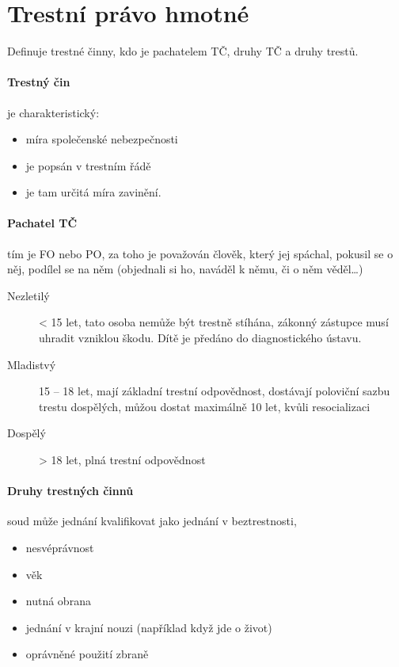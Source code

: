 \documentclass[10pt,a4paper,
twoside,%
]{report}
\begin{document}
\section{Trestní právo hmotné}
Definuje trestné činny, kdo je pachatelem TČ, druhy TČ a druhy trestů.

\paragraph{Trestný čin} je charakteristický:
\begin{itemize}
\item míra společenské nebezpečnosti
\item je popsán v trestním řádě
\item je tam určitá míra zavinění.
\end{itemize}

\paragraph{Pachatel TČ} tím je FO nebo PO, za toho je považován člověk, který jej spáchal, pokusil se o něj, podílel se na něm (objednali si ho, naváděl k němu, či o něm věděl\dots)
\begin{description}
\item[Nezletilý] < 15 let, tato osoba nemůže být trestně stíhána, zákonný zástupce musí uhradit vzniklou škodu. Dítě je předáno do diagnostického ústavu.
\item[Mladistvý] 15 -- 18 let, mají základní trestní odpovědnost, dostávají poloviční sazbu trestu dospělých, můžou dostat maximálně 10 let, kvůli resocializaci 
\item[Dospělý] > 18 let, plná trestní odpovědnost
\end{description}

\paragraph{Druhy trestných činnů} soud může jednání kvalifikovat jako jednání v beztrestnosti,
\begin{itemize}
\item nesvéprávnost
\item věk
\item nutná obrana
\item jednání v krajní nouzi (například když jde o život)
\item oprávněné použití zbraně
\end{itemize}
\end{document}
